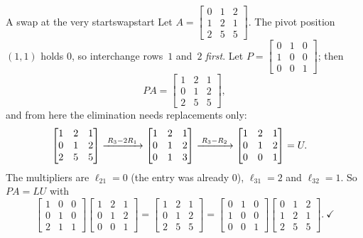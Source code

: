 \documentclass[11pt]{article}
\begin{document}
\begin{exmp}{A swap at the very start}{swapstart}
Let $A=\begin{bmatrix}0&1&2\\1&2&1\\2&5&5\end{bmatrix}$. The pivot position $(1,1)$ holds $0$, so interchange rows~$1$ and~$2$ \emph{first}. Let $P=\begin{bmatrix}0&1&0\\1&0&0\\0&0&1\end{bmatrix}$; then
\[
PA=\begin{bmatrix}1&2&1\\0&1&2\\2&5&5\end{bmatrix},
\]
and from here the elimination needs replacements only:
\begin{align*}
\begin{bmatrix}1&2&1\\0&1&2\\2&5&5\end{bmatrix}
&\xrightarrow{\;R_3-2R_1\;}
\begin{bmatrix}1&2&1\\0&1&2\\0&1&3\end{bmatrix}
\xrightarrow{\;R_3-R_2\;}
\begin{bmatrix}1&2&1\\0&1&2\\0&0&1\end{bmatrix}=U .
\end{align*}
The multipliers are $\ell_{21}=0$ (the entry was already $0$), $\ell_{31}=2$ and $\ell_{32}=1$. So $PA=LU$ with
\[
\begin{bmatrix}1&0&0\\0&1&0\\2&1&1\end{bmatrix}\begin{bmatrix}1&2&1\\0&1&2\\0&0&1\end{bmatrix}=\begin{bmatrix}1&2&1\\0&1&2\\2&5&5\end{bmatrix}=\begin{bmatrix}0&1&0\\1&0&0\\0&0&1\end{bmatrix}\begin{bmatrix}0&1&2\\1&2&1\\2&5&5\end{bmatrix}.\ \checkmark
\]
\end{exmp}
\end{document}
